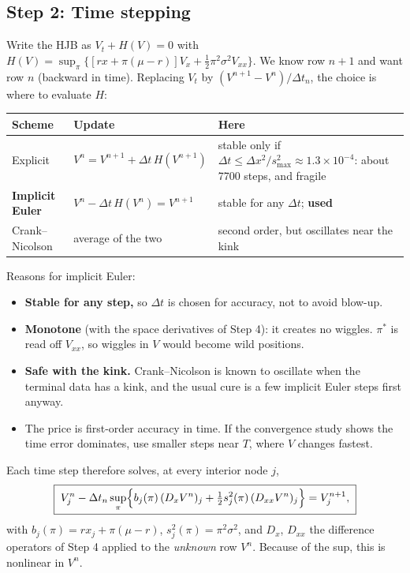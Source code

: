 \documentclass[11pt]{article}
\begin{document}
\subsection*{Step 2: Time stepping}
Write the HJB as $V_t + H(V)=0$ with
$H(V)=\sup_\pi\{[rx+\pi(\mu-r)]V_x+\tfrac12\pi^2\sigma^2V_{xx}\}$. We know row $n+1$ and want
row $n$ (backward in time). Replacing $V_t$ by $(V^{n+1}-V^n)/\Delta t_n$, the choice is
where to evaluate $H$:
\begin{center}
\small
\begin{tabular}{@{}lp{}p{}@{}}
\toprule
Scheme & Update & Here \\
\midrule
Explicit & $V^n = V^{n+1} + \Delta t\,H(V^{n+1})$
  & stable only if $\Delta t\le\Delta x^2/s^2_{\max}\approx1.3\times10^{-4}$: about 7700
    steps, and fragile \\
\textbf{Implicit Euler} & $V^n - \Delta t\,H(V^n) = V^{n+1}$
  & stable for any $\Delta t$; \textbf{used} \\
Crank--Nicolson & average of the two
  & second order, but oscillates near the kink \\
\bottomrule
\end{tabular}
\end{center}
Reasons for implicit Euler:
\begin{itemize}
  \item \textbf{Stable for any step,} so $\Delta t$ is chosen for accuracy, not to avoid
        blow-up.
  \item \textbf{Monotone} (with the space derivatives of Step 4): it creates no wiggles.
        $\pi^*$ is read off $V_{xx}$, so wiggles in $V$ would become wild positions.
  \item \textbf{Safe with the kink.} Crank--Nicolson is known to oscillate when the terminal
        data has a kink, and the usual cure is a few implicit Euler steps first anyway.
  \item The price is first-order accuracy in time. If the convergence study shows the time
        error dominates, use smaller steps near $T$, where $V$ changes fastest.
\end{itemize}
Each time step therefore solves, at every interior node $j$,
\[
  \boxed{\;V_j^n - \Delta t_n\sup_{\pi}\Bigl\{b_j(\pi)\,(D_xV^n)_j
      + \tfrac12 s_j^2(\pi)\,(D_{xx}V^n)_j\Bigr\} = V_j^{n+1},\;}
\]
with $b_j(\pi)=rx_j+\pi(\mu-r)$, $s_j^2(\pi)=\pi^2\sigma^2$, and $D_x$, $D_{xx}$ the difference
operators of Step 4 applied to the \emph{unknown} row $V^n$. Because of the sup, this is
nonlinear in $V^n$.
\end{document}
